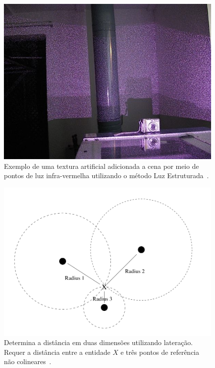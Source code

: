 		\begin{figure}[hbt]
			\begin{center}
				\includegraphics[scale=0.5]{figuras/2.FundamentacaoTeorica/structured-light.jpg}
			\end{center}
			\caption{Exemplo de uma textura artificial adicionada a cena por meio de pontos de luz infra-vermelha utilizando o método Luz Estruturada~\cite{img-strutuctured-light}.}
			\label{fig:structured-light}
		\end{figure}

		\begin{figure}[hbt]
		\begin{center}
			\includegraphics[scale=0.2]{figuras/2.FundamentacaoTeorica/lateration.png}
		\end{center}
		\caption{Determina a distância em duas dimensões utilizando lateração. Requer a distância entre a entidade $\displaystyle X$ e três pontos de referência não colineares~\cite{triangulacao}.}
		\label{lateration}
	\end{figure}

